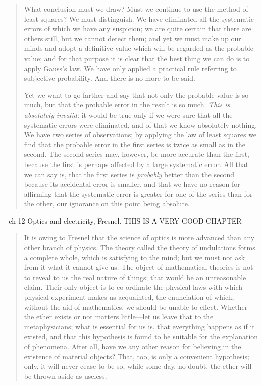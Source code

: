 \documentclass{article}
\begin{document}
\begin{quote}
     What conclusion must we draw?  Must we continue to use the method of least squares?  We must distinguish.  We have eliminated all the systematic errors of which we have any suspicion; we are quite certain that there are others still, but we cannot detect them; and yet we must make up our minds and adopt a definitive value which will be regarded as the probable value; and for that purpose it is clear that the best thing we can do is to apply Gauss's law.  We have only applied a practical rule referring to subjective probability.  And there is no more to be said.
     
     Yet we want to go farther and say that not only the probable value is so much, but that the probable error in the result is so much.  \emph{This is absolutely invalid:}  it would be true only if we were sure that all the systematic errors were eliminated, and of that we know absolutely nothing.  We have two series of observations; by applying the law of least squares we find that the probable error in the first series is twice as small as in the second.  The second series may, however, be more accurate than the first, because the first is perhaps affected by a large systematic error.  All that we can say is, that the first series is \emph{probably} better than the second because its accidental error is smaller, and that we have no reason for affirming that the systematic error is greater for one of the series than for the other, our ignorance on this point being absolute.
     
     \cite[p. 207-209]{Poincare1952}
 \end{quote}
 
 
 - ch 12 Optics and electricity, Fresnel.  THIS IS A VERY GOOD CHAPTER
 
\begin{quote}
    It is owing to Fresnel that the science of optics is more advanced than any other branch of physics.  The theory called the theory of undulations forms a complete whole, which is satisfying to the mind; but we must not ask from it what it cannot give us.  The object of mathematical theories is not to reveal to us the real nature of things; that would be an unreasonable claim.  Their only object is to co-ordinate the physical laws with which physical experiment makes us acquainted, the enunciation of which, without the aid of mathematics, we should be unable to effect.  Whether the ether exists or not matters little---let us leave that to the metaphysicians; what is essential for us is, that everything happens as if it existed, and that this hypothesis is found to be suitable for the explanation of phenomena.  After all, have we any other reason for believing in the existence of material objects?  That, too, is only a convenient hypothesis; only, it will never cease to be so, while some day, no doubt, the ether will be thrown aside as useless.
    
    \citep[p. 211-212]{Poincare1952}
\end{quote}
\end{document}
